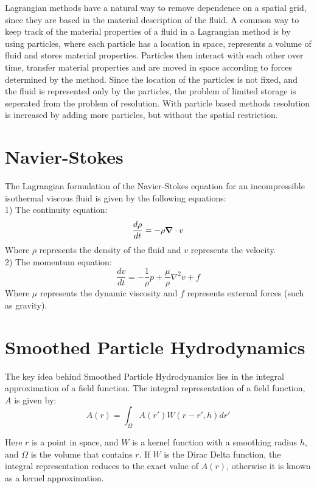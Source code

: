 Lagrangian methods have a natural way to remove dependence on a spatial grid,
since they are based in the material description of the fluid. A common way to
keep track of the material properties of a fluid in a Lagrangian method is by
using particles, where each particle has a location in space, represents a
volume of fluid and stores material properties. Particles then interact with
each other over time, transfer material properties and are moved in space
according to forces determined by the method. Since the location of the
particles is not fixed, and the fluid is represented only by the particles, the
problem of limited storage is seperated from the problem of resolution. With
particle based methods resolution is increased by adding more particles, but
without the spatial restriction.



\section{Navier-Stokes}

The Lagrangian formulation of the Navier-Stokes equation for an incompressible
isothermal viscous fluid is given by the following equations: \\
1) The continuity equation:
$$
\frac{d\rho}{dt} = -\rho \mbox{\boldmath$ \nabla $} \cdot v
$$
Where $\rho$ represents the density of the fluid and $v$ represents the velocity.\\


2) The momentum equation:
$$
\frac{dv}{dt} = -\frac{1}{\rho}p + \frac{\mu}{\rho} \nabla^2 v + f
$$
Where $\mu$ represents the dynamic viscosity and $f$ represents external forces (such as gravity).


\section{Smoothed Particle Hydrodynamics}

The key idea behind Smoothed Particle Hydrodynamics lies in the integral
approximation of a field function. The integral representation of a field
function, $A$ is given by: 
$$
A(r) = \int_\Omega A(r')W(r-r', h)dr'
$$

Here $r$ is a point in space, and $W$ is a kernel function with a smoothing radius
$h$, and $\Omega$ is the volume that contains $r$. If $W$ is the Dirac Delta
function, the integral representation reduces to the exact value of $A(r)$,
otherwise it is known as a kernel approximation.

